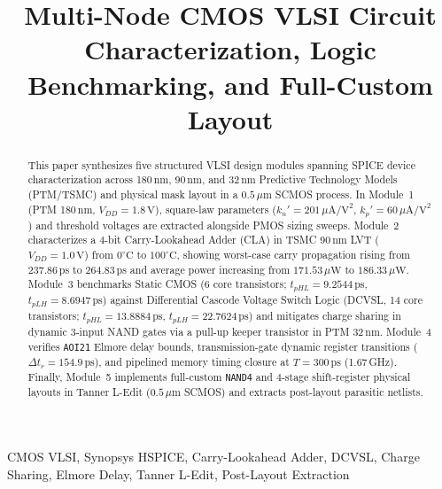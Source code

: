 \documentclass[conference]{IEEEtran}
\begin{document}
\title{Multi-Node CMOS VLSI Circuit Characterization, Logic Benchmarking, and Full-Custom Layout}

\author{
}

\maketitle

\begin{abstract}
This paper synthesizes five structured VLSI design modules spanning SPICE device characterization across 180\,nm, 90\,nm, and 32\,nm Predictive Technology Models (PTM/TSMC) and physical mask layout in a $0.5\,\mu\text{m}$ SCMOS process. In Module~1 (PTM 180\,nm, $V_{DD} = 1.8\,\text{V}$), square-law parameters ($k_n' = 201\,\mu\text{A/V}^2$, $k_p' = 60\,\mu\text{A/V}^2$) and threshold voltages are extracted alongside PMOS sizing sweeps. Module~2 characterizes a 4-bit Carry-Lookahead Adder (CLA) in TSMC 90\,nm LVT ($V_{DD} = 1.0\,\text{V}$) from $0^\circ\text{C}$ to $100^\circ\text{C}$, showing worst-case carry propagation rising from 237.86\,ps to 264.83\,ps and average power increasing from $171.53\,\mu\text{W}$ to $186.33\,\mu\text{W}$. Module~3 benchmarks Static CMOS (6 core transistors; $t_{pHL} = 9.2544\,\text{ps}$, $t_{pLH} = 8.6947\,\text{ps}$) against Differential Cascode Voltage Switch Logic (DCVSL, 14 core transistors; $t_{pHL} = 13.8884\,\text{ps}$, $t_{pLH} = 22.7624\,\text{ps}$) and mitigates charge sharing in dynamic 3-input NAND gates via a pull-up keeper transistor in PTM 32\,nm. Module~4 verifies \texttt{AOI21} Elmore delay bounds, transmission-gate dynamic register transitions ($\Delta t_r = 154.9\,\text{ps}$), and pipelined memory timing closure at $T = 300\,\text{ps}$ (1.67\,GHz). Finally, Module~5 implements full-custom \texttt{NAND4} and 4-stage shift-register physical layouts in Tanner L-Edit ($0.5\,\mu\text{m}$ SCMOS) and extracts post-layout parasitic netlists.
\end{abstract}

\begin{IEEEkeywords}
CMOS VLSI, Synopsys HSPICE, Carry-Lookahead Adder, DCVSL, Charge Sharing, Elmore Delay, Tanner L-Edit, Post-Layout Extraction
\end{IEEEkeywords}
\end{document}
